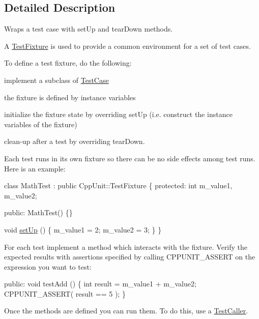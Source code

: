 \subsection{Detailed Description}
Wraps a test case with set\+Up and tear\+Down methods.

A \hyperlink{class_test_fixture}{Test\+Fixture} is used to provide a common environment for a set of test cases. 

To define a test fixture, do the following\+:
\begin{DoxyItemize}
\item implement a subclass of \hyperlink{class_test_case}{Test\+Case}
\item the fixture is defined by instance variables
\item initialize the fixture state by overriding set\+Up (i.\+e. construct the instance variables of the fixture)
\item clean-\/up after a test by overriding tear\+Down.
\end{DoxyItemize}

Each test runs in its own fixture so there can be no side effects among test runs. Here is an example\+:


\begin{DoxyCode}
\textcolor{keyword}{class }MathTest : \textcolor{keyword}{public} CppUnit::TestFixture \{
\textcolor{keyword}{protected}:
  \textcolor{keywordtype}{int} m\_value1, m\_value2;

\textcolor{keyword}{public}:
  MathTest() \{\}

  \textcolor{keywordtype}{void} \hyperlink{class_test_fixture_a0e77590b14a3ec7f93fe02e5b89a242f}{setUp} () \{
    m\_value1 = 2;
    m\_value2 = 3;
  \}
\}
\end{DoxyCode}


For each test implement a method which interacts with the fixture. Verify the expected results with assertions specified by calling C\+P\+P\+U\+N\+I\+T\+\_\+\+A\+S\+S\+E\+RT on the expression you want to test\+:


\begin{DoxyCode}
\textcolor{keyword}{public}: 
  \textcolor{keywordtype}{void} testAdd () \{
    \textcolor{keywordtype}{int} result = m\_value1 + m\_value2;
    CPPUNIT\_ASSERT( result == 5 );
  \}
\end{DoxyCode}


Once the methods are defined you can run them. To do this, use a \hyperlink{class_test_caller}{Test\+Caller}.


